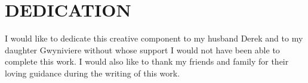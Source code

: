 \chapter*{DEDICATION}

I would like to dedicate this creative component to my husband Derek and
to my daughter Gwyniviere without whose support I would not have
been able to complete this work.
I would also like to thank my friends and family for their loving guidance during the writing of this work.

